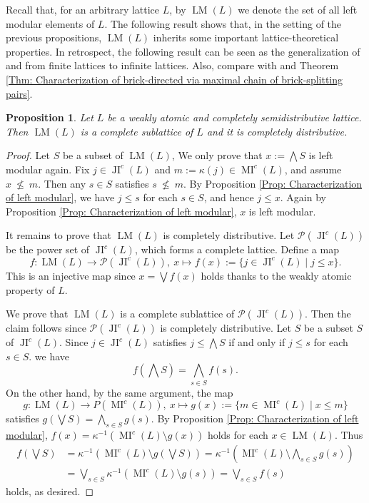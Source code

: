 \documentclass{amsart}
\theoremstyle{thmstyle}
\newtheorem{proposition}[thm]{Proposition}
\theoremstyle{exstyle}
\theoremstyle{defstyle}
\theoremstyle{remstyle}
\theoremstyle{remstyle}
\DeclareMathOperator*{\JI}{JI}
\DeclareMathOperator*{\MI}{MI}
\DeclareMathOperator*{\LM}{LM}
\begin{document}
Recall that, for an arbitrary lattice $L$, by $\LM(L)$ we denote the set of all left modular elements of $L$. 
The following result shows that, in the setting of the previous propositions, $\LM(L)$ inherits some important lattice-theoretical properties. 
In retrospect, the following result can be seen as the generalization of \cite[Prop. 2.6]{TW} and \cite[Cor. 5.3]{AI+} from finite lattices to infinite lattices. Also, compare with \cite[Theorem 1.1]{AI+} and Theorem \ref{Thm: Characterization of brick-directed via maximal chain of brick-splitting pairs}.

\begin{proposition}\label{Prop: LM(L) is distributive sublattice}
Let $L$ be a weakly atomic and completely semidistributive lattice. 
Then $\LM(L)$ is a complete sublattice of $L$ and it is completely distributive.
\end{proposition}

\begin{proof}
Let $S$ be a subset of $\LM(L)$, We only prove that $x:=\bigwedge S$ is left modular again.
Fix $j\in{\JI^c}(L)$ and $m:=\kappa(j)\in{\MI^c}(L)$, and assume $x\ {\not\leq}\ m$. Then any $s\in S$ satisfies $s\ {\not\leq}\ m$. By Proposition \ref{Prop: Characterization of left modular}, we have $j\leq s$ for each $s\in S$, and hence $j\leq x$. Again by Proposition \ref{Prop: Characterization of left modular}, $x$ is left modular.

It remains to prove that $\LM(L)$ is completely distributive.
Let $\mathcal{P}({\JI^c}(L))$ be the power set of ${\JI^c}(L)$, which forms a complete lattice. Define a map
\[f:\LM(L)\to \mathcal{P}({\JI\nolimits^c}(L)),\ x\mapsto f(x):=\{j\in{\JI\nolimits^c}(L)\mid j\le x\}.\]
This is an injective map since $x=\bigvee f(x)$ holds thanks to the weakly atomic property of $L$.

We prove that $\LM(L)$ is a complete sublattice of $\mathcal{P}({\JI^c}(L))$. Then the claim follows since $\mathcal{P}({\JI^c}(L))$ is completely distributive.
Let $S$ be a subset $S$ of ${\JI^c}(L)$. Since  $j\in{\JI^c}(L)$ satisfies $j\le\bigwedge S$ if and only if $j\le s$ for each $s\in S$.
we have
\[f(\bigwedge S)=\bigwedge_{s\in S} f(s).\]
On the other hand, by the same argument, the map
\[g:\LM(L)\to P({\MI\nolimits^c}(L)),\ x\mapsto g(x):=\{m\in{\MI\nolimits^c}(L)\mid x\le m\}\]
satisfies $g(\bigvee S)=\bigwedge_{s\in S} g(s)$.
By Proposition \ref{Prop: Characterization of left modular}, $f(x)=\kappa^{-1}({\MI^c}(L)\setminus g(x))$ holds for each $x\in\LM(L)$. Thus
\begin{align*}
f(\bigvee S)&=\kappa^{-1}({\MI\nolimits^c}(L)\setminus g(\bigvee S))=\kappa^{-1}({\MI\nolimits^c}(L)\setminus \bigwedge_{s\in S}g(s))\\
&=\bigvee_{s\in S}\kappa^{-1}({\MI\nolimits^c}(L)\setminus g(s))=\bigvee_{s\in S}f(s)
\end{align*}
holds, as desired.
\end{proof}
\end{document}
